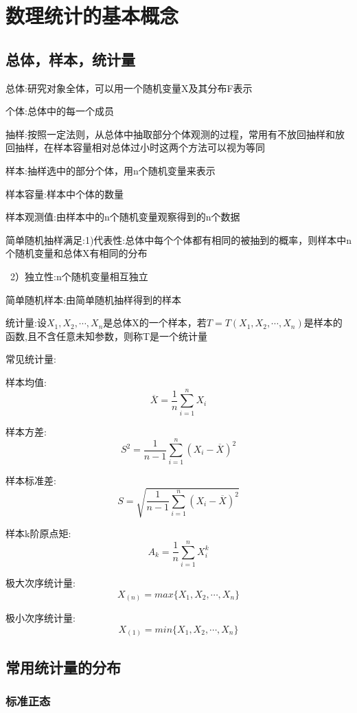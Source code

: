 \documentclass[11pt,twoside,a4paper]{ctexart}
\begin{document}
\section{数理统计的基本概念}
\subsection{总体，样本，统计量}
总体:研究对象全体，可以用一个随机变量X及其分布F表示

个体:总体中的每一个成员

抽样:按照一定法则，从总体中抽取部分个体观测的过程，常用有不放回抽样和放回抽样，在样本容量相对总体过小时这两个方法可以视为等同

样本:抽样选中的部分个体，用n个随机变量来表示

样本容量:样本中个体的数量

样本观测值:由样本中的n个随机变量观察得到的n个数据

简单随机抽样满足:1)代表性:总体中每个个体都有相同的被抽到的概率，则样本中n个随机变量和总体X有相同的分布 

\  2）独立性:n个随机变量相互独立

简单随机样本:由简单随机抽样得到的样本

统计量:设$X_1,X_2,\cdots ,X_n$是总体X的一个样本，若$T = T(X_1,X_2,\cdots ,X_n)$是样本的函数,且不含任意未知参数，则称T是一个统计量

常见统计量:
\begin{minipage}[t]{0.9\linewidth}
    样本均值:
    \[\overline{X} = \frac{1}{n}\sum _{i=1}^n X_i\]

    样本方差:
    \[S^2 = \frac{1}{n-1}\sum _{i=1}^n (X_i - \overline{X})^2\]

    样本标准差:
    \[S = \sqrt{\frac{1}{n-1}\sum _{i=1}^n (X_i - \overline{X})^2} \]

    样本k阶原点矩:
    \[A_k = \frac{1}{n}\sum _{i=1}^n X_i^k\]

    极大次序统计量:
    \[X_{(n)} = max\{X_1,X_2,\cdots ,X_n \}\]

    极小次序统计量:
    \[X_{(1)} = min\{X_1,X_2,\cdots ,X_n \}\]

\end{minipage}

\subsection{常用统计量的分布}

\subsubsection{标准正态}
\end{document}
